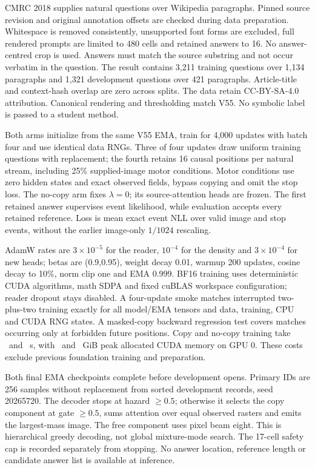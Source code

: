 \documentclass[10pt,a4paper]{article}
\begin{document}
CMRC 2018 supplies natural questions over Wikipedia paragraphs\cite{cmrc}.
Pinned source revision and original annotation offsets are checked during data
preparation. Whitespace is removed consistently, unsupported font forms are
excluded, full rendered prompts are limited to 480 cells and retained answers
to 16. No answer-centred crop is used. Answers must match the source substring
and not occur verbatim in the question. The result contains 3,211 training
questions over 1,134 paragraphs and 1,321 development questions over 421
paragraphs. Article-title and context-hash overlap are zero across splits.
The data retain CC-BY-SA-4.0 attribution. Canonical rendering and thresholding
match V55. No symbolic label is passed to a student method.

Both arms initialize from the same V55 EMA, train for 4,000 updates with batch
four and use identical data RNGs. Three of four updates draw uniform training
questions with replacement; the fourth retains 16 causal positions per natural
stream, including 25\% supplied-image motor conditions. Motor conditions use
zero hidden states and exact observed fields, bypass copying and omit the stop
loss. The no-copy arm fixes $\lambda=0$; its source-attention heads are frozen.
The first retained answer supervises event likelihood, while evaluation accepts
every retained reference. Loss is mean exact event NLL over valid image and
stop events, without the earlier image-only $1/1024$ rescaling.

AdamW rates are $3\times10^{-5}$ for the reader, $10^{-4}$ for the density and
$3\times10^{-4}$ for new heads; betas are (0.9,0.95), weight decay 0.01,
warmup 200 updates, cosine decay to 10\%, norm clip one and EMA 0.999. BF16
training uses deterministic CUDA algorithms, math SDPA and fixed cuBLAS
workspace configuration; reader dropout stays disabled. A four-update smoke
matches interrupted two-plus-two training exactly for all model/EMA tensors
and data, training, CPU and CUDA RNG states. A masked-copy backward regression
test covers matches occurring only at forbidden future positions. Copy and
no-copy training take \QaSeconds\ and \QaControlSeconds\ s, with
\QaMemory\ and \QaControlMemory\ GiB peak allocated CUDA memory on GPU 0.
These costs exclude previous foundation training and preparation.

Both final EMA checkpoints complete before development opens. Primary IDs are
256 samples without replacement from sorted development records, seed
20265720. The decoder stops at hazard $\geq0.5$; otherwise it selects the copy
component at gate $\geq0.5$, sums attention over equal observed rasters and
emits the largest-mass image. The free component uses pixel beam eight. This
is hierarchical greedy decoding, not global mixture-mode search. The 17-cell
safety cap is recorded separately from stopping. No answer location, reference
length or candidate answer list is available at inference.
\end{document}
